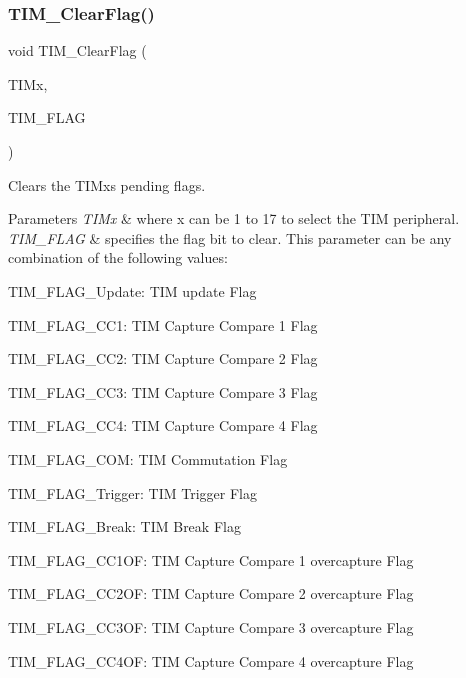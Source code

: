 \subsubsection{\texorpdfstring{TIM\_ClearFlag()}{TIM\_ClearFlag()}}
{\footnotesize\ttfamily void T\+I\+M\+\_\+\+Clear\+Flag (\begin{DoxyParamCaption}\item[{\mbox{\hyperlink{struct_t_i_m___type_def}{T\+I\+M\+\_\+\+Type\+Def}} $\ast$}]{T\+I\+Mx,  }\item[{uint16\+\_\+t}]{T\+I\+M\+\_\+\+F\+L\+AG }\end{DoxyParamCaption})}



Clears the T\+I\+Mx\textquotesingle{}s pending flags. 


\begin{DoxyParams}{Parameters}
{\em T\+I\+Mx} & where x can be 1 to 17 to select the T\+IM peripheral. \\
\hline
{\em T\+I\+M\+\_\+\+F\+L\+AG} & specifies the flag bit to clear. This parameter can be any combination of the following values\+: \begin{DoxyItemize}
\item T\+I\+M\+\_\+\+F\+L\+A\+G\+\_\+\+Update\+: T\+IM update Flag \item T\+I\+M\+\_\+\+F\+L\+A\+G\+\_\+\+C\+C1\+: T\+IM Capture Compare 1 Flag \item T\+I\+M\+\_\+\+F\+L\+A\+G\+\_\+\+C\+C2\+: T\+IM Capture Compare 2 Flag \item T\+I\+M\+\_\+\+F\+L\+A\+G\+\_\+\+C\+C3\+: T\+IM Capture Compare 3 Flag \item T\+I\+M\+\_\+\+F\+L\+A\+G\+\_\+\+C\+C4\+: T\+IM Capture Compare 4 Flag \item T\+I\+M\+\_\+\+F\+L\+A\+G\+\_\+\+C\+OM\+: T\+IM Commutation Flag \item T\+I\+M\+\_\+\+F\+L\+A\+G\+\_\+\+Trigger\+: T\+IM Trigger Flag \item T\+I\+M\+\_\+\+F\+L\+A\+G\+\_\+\+Break\+: T\+IM Break Flag \item T\+I\+M\+\_\+\+F\+L\+A\+G\+\_\+\+C\+C1\+OF\+: T\+IM Capture Compare 1 overcapture Flag \item T\+I\+M\+\_\+\+F\+L\+A\+G\+\_\+\+C\+C2\+OF\+: T\+IM Capture Compare 2 overcapture Flag \item T\+I\+M\+\_\+\+F\+L\+A\+G\+\_\+\+C\+C3\+OF\+: T\+IM Capture Compare 3 overcapture Flag \item T\+I\+M\+\_\+\+F\+L\+A\+G\+\_\+\+C\+C4\+OF\+: T\+IM Capture Compare 4 overcapture Flag \end{DoxyItemize}
\\
\hline
\end{DoxyParams}
